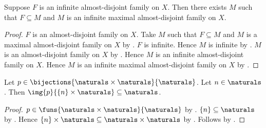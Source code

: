 \begin{theorem}\label{infinite_almost_disjoint_family_has_maximal_extension}
    Suppose $F$ is an infinite almost-disjoint family on $X$.
    Then there exists $M$ such that
        $F\subseteq M$ and
        $M$ is an infinite maximal almost-disjoint family on $X$.
\end{theorem}
\begin{proof}
    $F$ is an almost-disjoint family on $X$.
    Take $M$ such that $F\subseteq M$ and
        $M$ is a maximal almost-disjoint family on $X$
        by .
    $F$ is infinite.
    Hence $M$ is infinite by .
    $M$ is an almost-disjoint family on $X$
        by .
    Hence $M$ is an infinite almost-disjoint family on $X$.
    Hence $M$ is an infinite maximal almost-disjoint family on $X$
        by .
\end{proof}

\begin{proposition}\label{natural_pairing_row_subset}
    Let $p\in\bijections{\naturals\times\naturals}{\naturals}$.
    Let $n\in\naturals$.
    Then $\img{p}{\{n\}\times\naturals}\subseteq\naturals$.
\end{proposition}
\begin{proof}
    $p\in\funs{\naturals\times\naturals}{\naturals}$
        by .
    $\{n\}\subseteq\naturals$ by .
    Hence $\{n\}\times\naturals\subseteq
        \naturals\times\naturals$ by .
    Follows by .
\end{proof}

